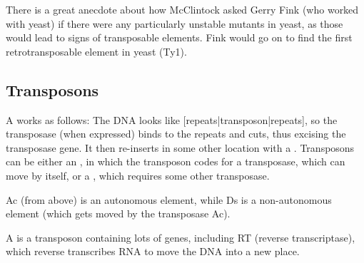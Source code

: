 There is a great anecdote about how McClintock asked Gerry Fink (who worked with yeast) if there were any particularly unstable mutants in yeast, as those would lead to signs of transposable elements. Fink would go on to find the first retrotransposable element in yeast (Ty1).

\subsection{Transposons}

\begin{defn}
	A  works as follows: The DNA looks like [repeats|transposon|repeats], so the transposase (when expressed) binds to the repeats and cuts, thus excising the transposase gene. It then re-inserts in some other location with a .
	Transposons can be either an , in which the transposon codes for a transposase, which can move by itself, or a , which requires some other transposase.
\end{defn}

\begin{exm}
	Ac (from above) is an autonomous element, while Ds is a non-autonomous element (which gets moved by the transposase Ac).
\end{exm}

\begin{defn}
	A  is a transposon containing lots of genes, including RT (reverse transcriptase), which reverse transcribes RNA to move the DNA into a new place.
\end{defn}
